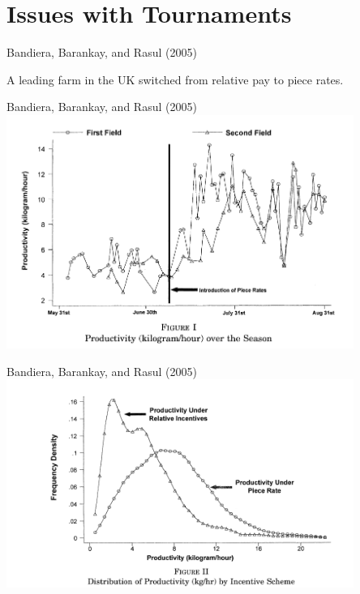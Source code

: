 \documentclass[aspectratio=169,usenames,dvipsnames]{beamer}
\begin{document}
\section{Issues with Tournaments}

\begin{frame}{Bandiera, Barankay, and Rasul (2005)}

\huge A leading farm in the UK switched from relative pay to piece rates.

    
\end{frame}

\begin{frame}[c]{Bandiera, Barankay, and Rasul (2005)}
\centering
\includegraphics[width=0.85\textwidth]{pictures/switched_time_tournament.png}

    
\end{frame}

\begin{frame}[c]{Bandiera, Barankay, and Rasul (2005)}
\centering
\includegraphics[width=0.85\textwidth]{pictures/switched_density_tournament.png}

    
\end{frame}
\end{document}
